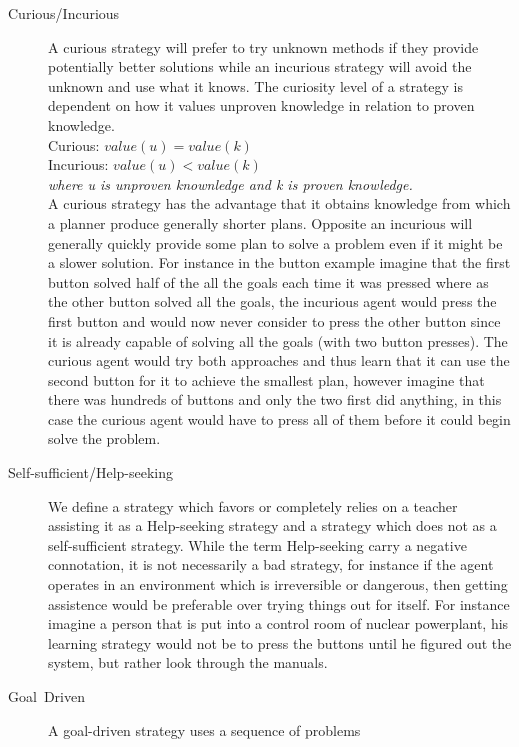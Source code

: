 \documentclass[master.tex]{subfiles}
\begin{document}
    \begin{description}
    \item [{Curious/Incurious}] A curious strategy will prefer to try unknown
    methods if they provide potentially better solutions while an incurious
    strategy will avoid the unknown and use what it knows. The curiosity
    level of a strategy is dependent on how it values unproven knowledge
    in relation to proven knowledge. \\
    Curious: $value(u)=value(k)$ \\
    Incurious: $value(u)<value(k)$ \\
    \emph{where u is unproven knownledge and k is proven knowledge.}\\
    A curious strategy has the advantage that it obtains knowledge from
    which a planner produce generally shorter plans. Opposite an incurious
    will generally quickly provide some plan to solve a problem even if
    it might be a slower solution. For instance in the button example
    imagine that the first button solved half of the all the goals each
    time it was pressed where as the other button solved all the goals,
    the incurious agent would press the first button and would now never
    consider to press the other button since it is already capable of
    solving all the goals (with two button presses). The curious agent
    would try both approaches and thus learn that it can use the second
    button for it to achieve the smallest plan, however imagine that there
    was hundreds of buttons and only the two first did anything, in this
    case the curious agent would have to press all of them before it could
    begin solve the problem.
    \item [{Self-sufficient/Help-seeking}] We define a strategy which favors
    or completely relies on a teacher assisting it as a Help-seeking strategy
    and a strategy which does not as a self-sufficient strategy. While
    the term Help-seeking carry a negative connotation, it is not necessarily
    a bad strategy, for instance if the agent operates in an environment
    which is irreversible or dangerous, then getting assistence would
    be preferable over trying things out for itself. For instance imagine
    a person that is put into a control room of nuclear powerplant, his
    learning strategy would not be to press the buttons until he figured
    out the system, but rather look through the manuals.
    \item [{Goal~Driven}] A goal-driven strategy uses a sequence of problems

\end{description}
\end{document}
